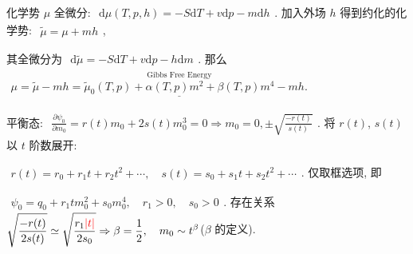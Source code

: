 \documentclass[../../main.tex]{subfiles}
\begin{document}
化学势 $\mu$ 全微分: $\begin{aligned}
    \mathrm{d}\mu(T,p,h) = -S\mathrm{d}T + v\mathrm{d}p -m\mathrm{d}h
\end{aligned}$. 加入外场 $h$ 得到约化的化学势: $\begin{aligned}
    \widetilde{\mu} = \mu+ mh
\end{aligned}$, 

其全微分为 $\begin{aligned}
    \mathrm{d}\widetilde{\mu} = -S\mathrm{d}T + v\mathrm{d}p -h\mathrm{d}m
\end{aligned}$. 那么 $\begin{aligned}
    \mu 
    = \widetilde{\mu} - mh 
    =\stackrel{\text{Gibbs Free Energy}}{\underline{\widetilde{\mu}_{0}(T,p) + \alpha(T,p)m^{2} + \beta(T,p)m^{4}}} - mh. 
\end{aligned}$

平衡态: $\begin{aligned}
    \frac{\partial\psi_{0}}{\partial m_{0}} = r(t)m_{0} + 2s(t)m_{0}^{3} = 0 \Rightarrow m_{0} = 0,\pm\sqrt{\frac{-r(t)}{s(t)}}
\end{aligned}$. 将 $r(t)$, $s(t)$ 以 $t$ 阶数展开: 

$\begin{aligned}
    r(t) = r_{0} + \boxed{r_{1}t} + r_{2}t^{2}+\cdots, \quad s(t) = \boxed{s_{0}} + s_{1}t + s_{2}t^{2}+\cdots
\end{aligned}$. 仅取框选项, 即

$\begin{aligned}
    \psi_{0} = q_{0} + r_{1}tm_{0}^{2} + s_{0}m_{0}^{4},\quad r_{1}>0,\quad s_{0}>0
\end{aligned}$. 存在关系 $\begin{aligned}
    \sqrt{\frac{-r(t)}{2s(t)}} \simeq \sqrt{\frac{r_{1}{\color{red}{|t|}}}{2s_{0}}}\Rightarrow \beta = \frac{1}{2},\quad m_{0}\sim t^{\beta}
\end{aligned}$($\beta$ 的定义). 
\end{document}
